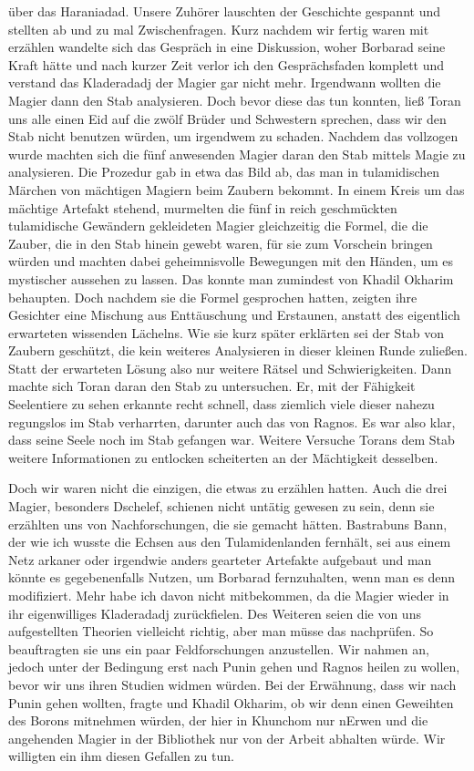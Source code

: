 über das Haraniadad. Unsere Zuhörer lauschten der Geschichte gespannt und stellten ab und zu mal Zwischenfragen. Kurz nachdem wir fertig waren mit erzählen wandelte sich das Gespräch in eine Diskussion, woher Borbarad seine Kraft hätte und nach kurzer Zeit verlor ich den Gesprächsfaden komplett und verstand das Kladeradadj der Magier gar nicht mehr. Irgendwann wollten die Magier dann den Stab analysieren. Doch bevor diese das tun konnten, ließ Toran uns alle einen Eid auf die zwölf Brüder und Schwestern sprechen, dass wir den Stab nicht benutzen würden, um irgendwem zu schaden. Nachdem das vollzogen wurde machten sich die fünf anwesenden Magier daran den Stab mittels Magie zu analysieren. Die Prozedur gab in etwa das Bild ab, das man in tulamidischen Märchen von mächtigen Magiern beim Zaubern bekommt. In einem Kreis um das mächtige Artefakt stehend, murmelten die fünf in reich geschmückten tulamidische Gewändern gekleideten Magier gleichzeitig die Formel, die die Zauber, die in den Stab hinein gewebt waren, für sie zum Vorschein bringen würden und machten dabei geheimnisvolle Bewegungen mit den Händen, um es mystischer aussehen zu lassen. Das konnte man zumindest von Khadil Okharim behaupten. Doch nachdem sie die Formel gesprochen hatten, zeigten ihre Gesichter eine Mischung aus Enttäuschung und Erstaunen, anstatt des eigentlich erwarteten wissenden Lächelns. Wie sie kurz später erklärten sei der Stab von Zaubern geschützt, die kein weiteres Analysieren in dieser kleinen Runde zuließen. Statt der erwarteten Lösung also nur weitere Rätsel und Schwierigkeiten. Dann machte sich Toran daran den Stab zu untersuchen. Er, mit der Fähigkeit Seelentiere zu sehen erkannte recht schnell, dass ziemlich viele dieser nahezu regungslos im Stab verharrten, darunter auch das von Ragnos. Es war also klar, dass seine Seele noch im Stab gefangen war. Weitere Versuche Torans dem Stab weitere Informationen zu entlocken scheiterten an der Mächtigkeit desselben.

Doch wir waren nicht die einzigen, die etwas zu erzählen hatten. Auch die drei Magier, besonders Dschelef, schienen nicht untätig gewesen zu sein, denn sie erzählten uns von Nachforschungen, die sie gemacht hätten. Bastrabuns Bann, der wie ich wusste die Echsen aus den Tulamidenlanden fernhält, sei aus einem Netz arkaner oder irgendwie anders gearteter Artefakte aufgebaut und man könnte es gegebenenfalls Nutzen, um Borbarad fernzuhalten, wenn man es denn modifiziert. Mehr habe ich davon nicht mitbekommen, da die Magier wieder in ihr eigenwilliges Kladeradadj zurückfielen. Des Weiteren seien die von uns aufgestellten Theorien vielleicht richtig, aber man müsse das nachprüfen. So beauftragten sie uns ein paar Feldforschungen anzustellen. Wir nahmen an, jedoch unter der Bedingung erst nach Punin gehen und Ragnos heilen zu wollen, bevor wir uns ihren Studien widmen würden. Bei der Erwähnung, dass wir nach Punin gehen wollten, fragte und Khadil Okharim, ob wir denn einen Geweihten des Borons mitnehmen würden, der hier in Khunchom nur nErwen und die angehenden Magier in der Bibliothek nur von der Arbeit abhalten würde. Wir willigten ein ihm diesen Gefallen zu tun.

